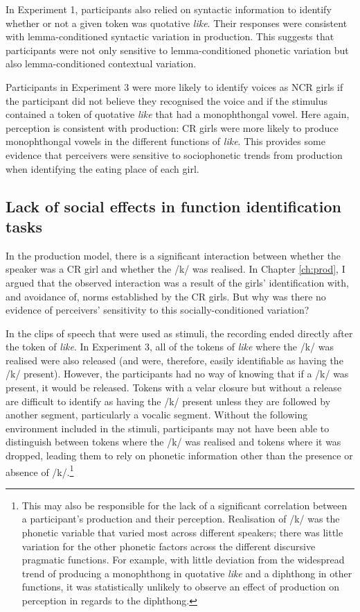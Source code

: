 \largerpage
In Experiment 1, participants also relied on syntactic information to identify whether or not a given token was quotative \textit{like}. Their responses were consistent with lemma-conditioned syntactic variation in production. This suggests that participants were not only sensitive to lemma-conditioned phonetic variation but also lemma-conditioned contextual variation.

Participants in Experiment 3 were more likely to identify voices as NCR girls if the participant did not believe they recognised the voice and if the stimulus contained a token of quotative \textit{like} that had a monophthongal vowel. Here again, perception is consistent with production: CR girls were more likely to produce monophthongal vowels in the different functions of \textit{like}. This provides some evidence that perceivers were sensitive to sociophonetic trends from production when identifying the eating place of each girl.


\subsection{Lack of social effects in function identification tasks}

In the pro\-duction model, there is a signif\-icant inter\-action be\-tween whe\-ther the speaker was a CR girl and whether the /k/ was realised. In Chapter \ref{ch:prod}, I argued that the observed interaction was a result of the girls' identification with, and avoidance of, norms established by the CR girls. But why was there no evidence of perceivers' sensitivity to this socially-conditioned variation?

In the clips of speech that were used as stimuli, the recording ended directly after the token of \textit{like}. In Experiment 3, all of the tokens of \textit{like} where the /k/ was realised were also released (and were, therefore, easily identifiable as having the /k/ present). However, the participants had no way of knowing that if a /k/ was present, it would be released. Tokens with a velar closure but without a release are difficult to identify as having the /k/ present unless they are followed by another segment, particularly a vocalic segment. Without the following environment included in the stimuli, participants may not have been able to distinguish between tokens where the /k/ was realised and tokens where it was dropped, leading them to rely on phonetic information other than the presence or absence of /k/.\footnote{This may also be responsible for the lack of a significant correlation between a participant's production and their perception. Realisation of /k/ was the phonetic variable that varied most across different speakers; there was little variation for the other phonetic factors across the different discursive pragmatic functions. For example, with little deviation from the widespread trend of producing a monophthong in quotative \textit{like} and a diphthong in other functions, it was statistically unlikely to observe an effect of production on perception in regards to the diphthong.}

